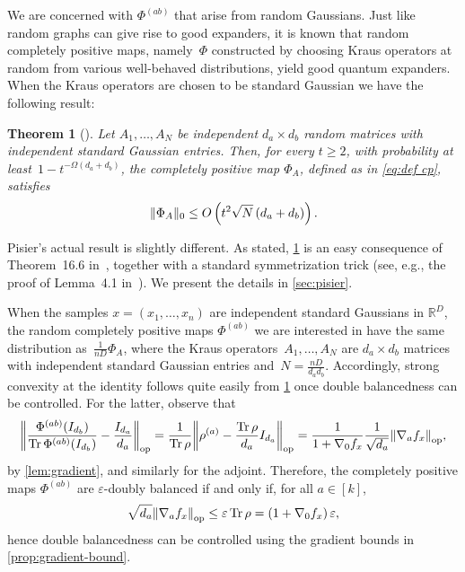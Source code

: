 \documentclass[aos]{imsart}
\newtheorem{theorem}{Theorem}[section]
\theoremstyle{definition}
\numberwithin{equation}{section}
\DeclareMathOperator{\op}{op}
\DeclareMathOperator{\tr}{Tr}
\DeclarePairedDelimiter{\norm}{\lVert}{\rVert}
\newcommand{\R}{{\mathbb{R}}}
\newcommand{\eps}{\varepsilon}
\begin{document}
We are concerned with $\Phi^{(ab)}$ that arise from random Gaussians.
Just like random graphs can give rise to good expanders, it is known that random completely positive maps, namely~$\Phi$ constructed by choosing Kraus operators at random from various well-behaved distributions, yield good quantum expanders.
When the Kraus operators are chosen to be standard Gaussian we have the following result:

\begin{theorem}[\cite{pisier2012grothendieck,P14}]\label{thm:hess-pisier}
Let $A_1,\dots,A_N$ be independent $d_a\times d_b$ random matrices with independent standard Gaussian entries.
Then, for every $t \geq 2$, with probability at least~$1 - t^{-\Omega(d_a + d_b)}$, the completely positive map $\Phi_A$, defined as in \cref{eq:def cp}, satisfies
\begin{align*}
  \norm{\Phi_A}_0 \leq O\left(t^{2} \sqrt N \left( d_a + d_b \right)\right).
\end{align*}
\end{theorem}

Pisier's actual result is slightly different.
As stated, \cref{thm:hess-pisier} is an easy consequence of Theorem~16.6 in~\cite{pisier2012grothendieck}, together with a standard symmetrization trick (see, e.g., the proof of Lemma~4.1 in~\cite{P14}).
We present the details in \cref{sec:pisier}.

When the samples $x=(x_1,\dots,x_n)$ are independent standard Gaussians in $\R^D$,
the random completely positive maps $\Phi^{(ab)}$ we are interested in have the same distribution as~$\frac1{nD}\Phi_A$, where the Kraus operators~$A_1,\dots,A_N$ are $d_a \times d_b$ matrices with independent standard Gaussian entries and~$N=\frac{nD}{d_ad_b}$.
Accordingly, strong convexity at the identity follows quite easily from \cref{thm:hess-pisier} once double balancedness can be controlled.
For the latter, observe that
\begin{align*}
  \norm*{\frac{\Phi^{(ab)}(I_{d_b})}{\tr \Phi^{(ab)}(I_{d_b})} - \frac{I_{d_a}}{d_a}}_{\op}
= \frac1{\tr\rho} \norm*{\rho^{(a)} - \frac{\tr \rho}{d_a} I_{d_a}}_{\op}
= \frac1{1 + \nabla_0 f_x} \frac1{\sqrt{d_a}} \norm*{\nabla_a f_x}_{\op},
\end{align*}
by \cref{lem:gradient}, and similarly for the adjoint.
Therefore, the completely positive maps $\Phi^{(ab)}$ are $\eps$-doubly balanced if and only if, for all $a\in[k]$,
\begin{align}\label{eq:balanced via grad}
  \sqrt{d_a} \norm*{\nabla_a f_x}_{\op} \leq \eps \tr \rho = \left( 1 + \nabla_0 f_x \right) \eps,
\end{align}
hence double balancedness can be controlled using the gradient bounds in \cref{prop:gradient-bound}.
\end{document}
